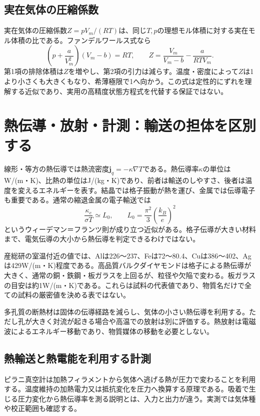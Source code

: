 \subsection{実在気体の圧縮係数}
\label{theory:thermo:realgas}
実在気体の圧縮係数$Z=pV_m/(RT)$は、同じ$T,p$の理想モル体積に対する実在モル体積の比である。ファンデルワールス式なら
\[
 \left(p+\frac{a}{V_m^2}\right)(V_m-b)=RT,
 \qquad Z=\frac{V_m}{V_m-b}-\frac{a}{RTV_m}.
\]
第1項の排除体積は$Z$を増やし、第2項の引力は減らす。温度・密度によって$Z$は1より小さくも大きくもなり、希薄極限で1へ向かう。この式は定性的にずれを理解する近似であり、実用の高精度状態方程式を代替する保証ではない。

\section{熱伝導・放射・計測：輸送の担体を区別する}
\label{theory:thermo:transport}
線形・等方の熱伝導では熱流密度$\boldsymbol{j}_q=-\kappa\nabla T$である。熱伝導率$\kappa$の単位はW/(m・K)、比熱の単位はJ/(kg・K)であり、前者は輸送のしやすさ、後者は温度を変えるエネルギーを表す。結晶では格子振動が熱を運び、金属では伝導電子も重要である。通常の縮退金属の電子輸送では
\[
 \frac{\kappa_e}{\sigma T}\simeq L_0,
 \qquad L_0=\frac{\pi^2}{3}\left(\frac{k_B}{e}\right)^2
\]
というウィーデマン＝フランツ則が成り立つ近似がある。格子伝導が大きい材料まで、電気伝導の大小から熱伝導を判定できるわけではない。

産総研の室温付近の値では、Alは226〜237、Feは72〜80.4、Cuは386〜402、Agは429W/(m・K)程度である\parencite{aist_metal_thermal}。高品質バルクダイヤモンドは格子による熱伝導が大きく、通常の銅・鉄鋼・板ガラスを上回るが、粒径や欠陥で変わる\parencite{wang_sun_diamond2024}。板ガラスの目安は約1W/(m・K)である\parencite{agc_glass_thermal}。これらは試料の代表値であり、物質名だけで全ての試料の厳密値を決める表ではない。

多孔質の断熱材は固体の伝導経路を減らし、気体の小さい熱伝導を利用する。ただし孔が大きく対流が起きる場合や高温での放射は別に評価する。熱放射は電磁波によるエネルギー移動であり、物質媒体の移動を必要としない。

\subsection{熱輸送と熱電能を利用する計測}
\label{theory:thermo:measurement}
ピラニ真空計は加熱フィラメントから気体へ逃げる熱が圧力で変わることを利用する。温度維持の加熱電力又は抵抗変化を圧力へ換算する原理である\parencite{ulvac_pirani}。吸着で生じる圧力変化から熱伝導率を測る説明とは、入力と出力が違う。実測では気体種や校正範囲も確認する。


